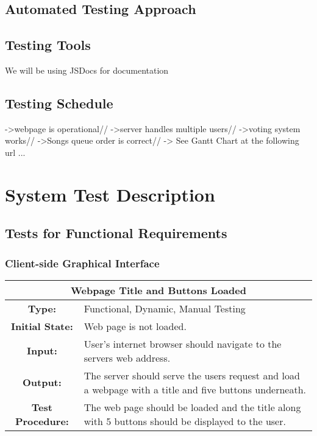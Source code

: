 \documentclass[12pt, titlepage]{article}
\begin{document}
\subsection{Automated Testing Approach}

\subsection{Testing Tools}
We will be using JSDocs for documentation 

\subsection{Testing Schedule}
->webpage is operational//
->server handles multiple users//
->voting system works//
->Songs queue order is correct//
->
See Gantt Chart at the following url ...

\section{System Test Description}

\subsection{Tests for Functional Requirements}

\subsubsection{Client-side Graphical Interface}

\begin{center}
\begin{table}[H]
\begin{tabularx}{\textwidth}{| c X |}
\hline
\multicolumn{2}{|c|}{\textbf{Webpage Title and Buttons Loaded}}\\
\hline
\textbf{Type: } & Functional, Dynamic, Manual Testing\\

\textbf{Initial State: } & Web page is not loaded.\\

\textbf{Input: } & User's internet browser should navigate to the servers web address.\\

\textbf{Output: } & The server should serve the users request and load a webpage with a title and five buttons underneath.\\

\textbf{Test Procedure:  } &   The web page should be loaded and the title along with 5 buttons should be displayed to the user.\\
\hline
\end{tabularx}
\end{table}
\end{center}
\end{document}
